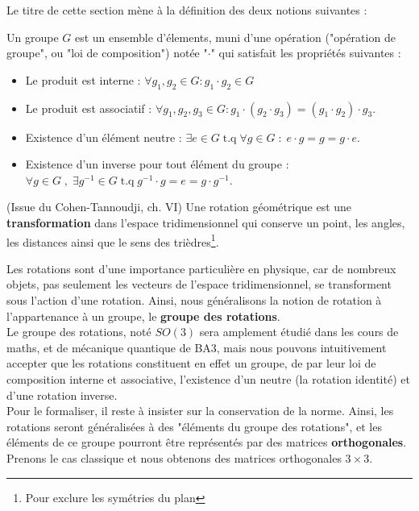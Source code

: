 \documentclass[../notesdecours.tex]{subfiles}
\begin{document}
Le titre de cette section mène à la définition des deux notions suivantes :
\begin{definition}
    Un groupe $G$ est un ensemble d'élements, muni d'une opération ("opération de groupe", ou "loi de composition") notée "$\cdot$" qui satisfait les propriétés suivantes :
    \begin{itemize}
        \item Le produit est interne : $\forall g_1, g_2 \in G : g_1\cdot g_2 \in G$
        \item Le produit est associatif : $\forall g_1, g_2, g_3 \in G : g_1\cdot(g_2\cdot g_3) = (g_1\cdot g_2)\cdot g_3.$
        \item Existence d'un élément neutre : $\exists e\in G \; \text{t.q} \; \forall g \in G \; : \; e\cdot g = g = g\cdot e$.
        \item Existence d'un inverse pour tout élément du groupe : $\forall g \in G\; ,\; \exists g^{-1}\in G \; \text{t.q} \; g^{-1}\cdot g = e = g\cdot g^{-1}.$
    \end{itemize}
\end{definition}
\begin{definition}(Issue du Cohen-Tannoudji, ch. VI)
    Une rotation géométrique est une \textbf{transformation} dans l'espace tridimensionnel qui conserve un point, les angles, les distances ainsi que le sens des trièdres\footnote{Pour exclure les symétries du plan}.
\end{definition}


Les rotations sont d'une importance particulière en physique, car de nombreux objets, pas seulement les vecteurs de l'espace tridimensionnel, se transforment sous l'action d'une rotation. Ainsi, nous généralisons la notion de rotation à l'appartenance à un groupe, le \textbf{groupe des rotations}. \\

Le groupe des rotations, noté $SO(3)$ sera amplement étudié dans les cours de maths, et de mécanique quantique de BA3, mais nous pouvons intuitivement accepter que les rotations constituent en effet un groupe, de par leur loi de composition interne et associative, l'existence d'un neutre (la rotation identité) et d'une rotation inverse. \\

Pour le formaliser, il reste à insister sur la conservation de la norme. Ainsi, les rotations seront généralisées à des "éléments du groupe des rotations", et les éléments de ce groupe pourront être représentés par des matrices \textbf{orthogonales}. Prenons le cas classique et nous obtenons des matrices orthogonales $3\times 3$.
\end{document}
